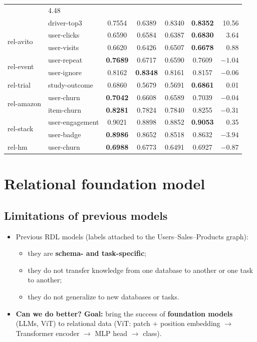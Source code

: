 \begin{table}[tb]
\begin{tabular}{@{}llccccr@{}}
      & 4.48\\
      & driver-top3 & 0.7554 & 0.6389 & 0.8340 & \textbf{0.8352} & 10.56\\
    \multirow{2}{*}{rel-avito} & user-clicks & 0.6590 & 0.6584 & 0.6387
      & \textbf{0.6830} & 3.64\\
      & user-visits & 0.6620 & 0.6426 & 0.6507 & \textbf{0.6678} & 0.88\\
    \multirow{2}{*}{rel-event} & user-repeat & \textbf{0.7689} & 0.6717 & 0.6590
      & 0.7609 & $-1.04$\\
      & user-ignore & 0.8162 & \textbf{0.8348} & 0.8161 & 0.8157 & $-0.06$\\
    rel-trial & study-outcome & 0.6860 & 0.5679 & 0.5691 & \textbf{0.6861} & 0.01\\
    \multirow{2}{*}{rel-amazon} & user-churn & \textbf{0.7042} & 0.6608 & 0.6589
      & 0.7039 & $-0.04$\\
      & item-churn & \textbf{0.8281} & 0.7824 & 0.7840 & 0.8255 & $-0.31$\\
    \multirow{2}{*}{rel-stack} & user-engagement & 0.9021 & 0.8898 & 0.8852
      & \textbf{0.9053} & 0.35\\
      & user-badge & \textbf{0.8986} & 0.8652 & 0.8518 & 0.8632 & $-3.94$\\
    rel-hm & user-churn & \textbf{0.6988} & 0.6773 & 0.6491 & 0.6927 & $-0.87$\\
    \bottomrule
  \end{tabular}
\end{table}

\section{Relational foundation model}\label{sec:lec13-rfm}

\subsection{Limitations of previous models}\label{sec:lec13-prev}

\begin{itemize}
  \item Previous RDL models (labels attached to the Users--Sales--Products graph):
    \begin{itemize}
      \item they are \textbf{schema- and task-specific};
      \item they do not transfer knowledge from one database to another or one task to
        another;
      \item they do not generalize to new databases or tasks.
    \end{itemize}
  \item \textbf{Can we do better? Goal:} bring the success of \textbf{foundation models}
    (LLMs, ViT) to relational data (ViT: patch + position embedding $\to$ Transformer
    encoder $\to$ MLP head $\to$ class).
\end{itemize}

